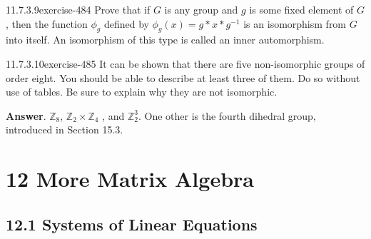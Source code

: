 \documentclass[twoside,10pt,]{book}
\numberwithin{equation}{section}
\begin{document}
\begin{divisionsolution}{11.7.3.9}{}{exercise-484}%
\hypertarget{p-4297}{}%
Prove that if \(G\) is any group and \(g\) is some fixed element of \(G\), then the function \(\phi _g\) defined by \(\phi_g(x) = g*x*g^{-1}\) is an isomorphism from \(G\) into itself.  An isomorphism of this type is called an inner automorphism.%
\end{divisionsolution}%
\begin{divisionsolution}{11.7.3.10}{}{exercise-485}%
\hypertarget{p-4298}{}%
It can be shown that there are five non-isomorphic groups of order eight. You should be able to describe at least three of them. Do so without use of tables. Be sure to explain why they are not isomorphic.%
\par\smallskip%
\noindent\textbf{Answer}.\quad%
\hypertarget{p-4299}{}%
\(\mathbb{Z}_8\), \(\mathbb{Z}_2\times  \mathbb{Z}_4\) , and \(\mathbb{Z}_2^3\). One other is the fourth dihedral group, introduced in Section 15.3.%
\end{divisionsolution}%
\chapter*{12 More Matrix Algebra}
\section*{12.1 Systems of Linear Equations}
\end{document}
